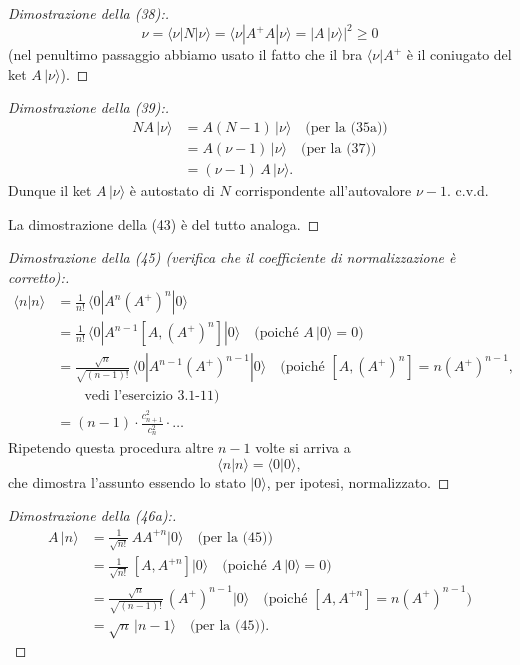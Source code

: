 \documentclass[11pt, a4paper]{book}
\numberwithin{equation}{section}
\begin{document}
\begin{proof}[Dimostrazione della (38):]
\[
\nu = \langle\nu|N|\nu\rangle = \langle\nu|A^+A|\nu\rangle
= |A\,|\nu\rangle|^2 \geq 0
\]
(nel penultimo passaggio abbiamo usato il fatto che il bra $\langle\nu|A^+$
è il coniugato del ket $A\,|\nu\rangle$).
\end{proof}

\begin{proof}[Dimostrazione della (39):]
\begin{align*}
NA\,|\nu\rangle &= A(N-1)\,|\nu\rangle \quad \text{(per la (35a))} \\
  &= A(\nu-1)\,|\nu\rangle \quad \text{(per la (37))} \\
  &= (\nu-1)\,A\,|\nu\rangle.
\end{align*}
Dunque il ket $A\,|\nu\rangle$ è autostato di $N$ corrispondente all'autovalore
$\nu-1$. c.v.d.

La dimostrazione della (43) è del tutto analoga.
\end{proof}

\begin{proof}[Dimostrazione della (45) (verifica che il coefficiente di
normalizzazione è corretto):]
\begin{align*}
\langle n|n\rangle
  &= \frac{1}{n!}\,\langle 0|A^n(A^+)^n|0\rangle \\
  &= \frac{1}{n!}\,\langle 0|A^{n-1}[A,(A^+)^n]|0\rangle
     \quad \text{(poiché }A\,|0\rangle = 0\text{)} \\
  &= \frac{\sqrt{n}}{\sqrt{(n-1)!}}\,\langle 0|A^{n-1}(A^+)^{n-1}|0\rangle
     \quad \text{(poiché }[A,(A^+)^n] = n(A^+)^{n-1}\text{,}\\
     &\qquad\text{vedi l'esercizio 3.1-11)} \\
  &= (n-1)\cdot\frac{c_{n+1}^2}{c_n^2}\cdot\ldots
\end{align*}
Ripetendo questa procedura altre $n-1$ volte si arriva a
\[
\langle n|n\rangle = \langle 0|0\rangle,
\]
che dimostra l'assunto essendo lo stato $|0\rangle$, per ipotesi,
normalizzato.
\end{proof}


\begin{proof}[Dimostrazione della (46a):]
\begin{align*}
A\,|n\rangle
  &= \frac{1}{\sqrt{n!}}\,AA^{+n}|0\rangle
     \quad \text{(per la (45))} \\
  &= \frac{1}{\sqrt{n!}}\,[A,A^{+n}]|0\rangle
     \quad \text{(poiché }A\,|0\rangle = 0\text{)} \\
  &= \frac{\sqrt{n}}{\sqrt{(n-1)!}}\,(A^+)^{n-1}|0\rangle
     \quad \text{(poiché }[A,A^{+n}] = n(A^+)^{n-1}\text{)} \\
  &= \sqrt{n}\,|n-1\rangle
     \quad \text{(per la (45))}.
\end{align*}
\end{proof}
\end{document}
